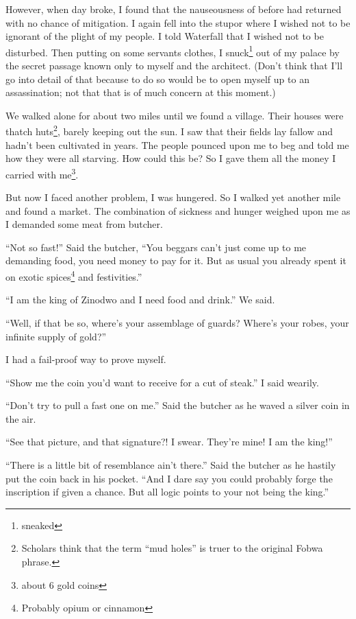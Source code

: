 \tbreak

However, when day broke, I found that the nauseousness of before had returned with no chance of mitigation. I again fell into the stupor where I wished not to be ignorant of the plight of my people. I told Waterfall that I wished not to be disturbed. Then putting on some servants clothes, I snuck\footnote{sneaked} out of my palace by the secret passage known only to myself and the architect. (Don't think that I'll go into detail of that because to do so would be to open myself up to an assassination; not that that is of much concern at this moment.)

We walked alone for about two miles until we found a village.
Their houses were thatch huts\footnote{Scholars think that the term ``mud holes'' is truer to the original Fo\-bwa phrase.}, barely keeping out the sun.
I saw that their fields lay fallow and hadn't been cultivated in years.
The people pounced upon me to beg and told me how they were all starving.
How could this be? So I gave them all the money I carried with me\footnote{about 6 gold coins}.

But now I faced another problem, I was hungered. So I walked yet another mile and found a market.
The combination of sickness and hunger weighed upon me as I demanded some meat from butcher.

``Not so fast!'' Said the butcher, ``You beggars can't just come up to me demanding food, you need money to pay for it.
But as usual you already spent it on exotic spices\footnote{Probably opium or cinnamon} and festivities.''

``I am the king of Zi\-no\-dwo and I need food and drink.'' We said.

``Well, if that be so, where's your assemblage of guards? Where's your robes, your infinite supply of gold?''

I had a fail-proof way to prove myself.

``Show me the coin you'd want to receive for a cut of steak.'' I said wearily.

``Don't try to pull a fast one on me.'' Said the butcher as he waved a silver coin in the air.

``See that picture, and that signature?! I swear. They're mine! I am the king!''

``There is a little bit of resemblance ain't there.'' Said the butcher as he hastily put the coin back in his pocket.
``And I dare say you could probably forge the inscription if given a chance. But all logic points to your not being the king.''

